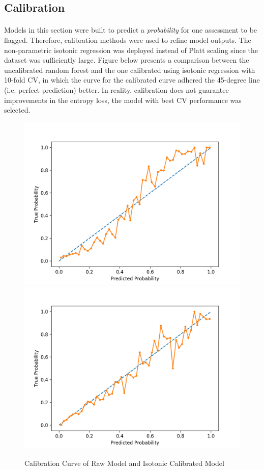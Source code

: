 \documentclass[11pt]{article}
\begin{document}
 	\subsection{Calibration}
 	\paragraph{} Models in this section were built to predict a \emph{probability} for one assessment to be flagged. Therefore, calibration methods were used to refine model outputs. The non-parametric isotonic regression was deployed instead of Platt scaling since the dataset was sufficiently large. Figure below presents a comparison between the uncalibrated random forest and the one calibrated using isotonic regression with 10-fold CV, in which the curve for the calibrated curve adhered the 45-degree line (i.e. perfect prediction) better. In reality, calibration does not guarantee improvements in the entropy loss, the model with best CV performance was selected.
 	\begin{figure}[H]
 		\centering
 		\includegraphics[width=0.7\linewidth]{figures/calibration_curve_raw_model.png}
 		\includegraphics[width=0.7\linewidth]{figures/calibration_curve_calibrated_model.png}
 		\caption{Calibration Curve of Raw Model and Isotonic Calibrated Model}
 	\end{figure}
\end{document}
